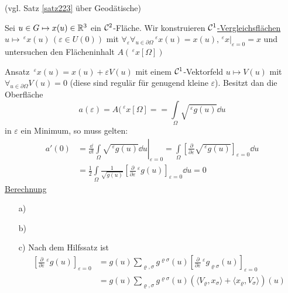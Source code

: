 \begin{beweis}
(vgl. Satz \ref{satz223} über Geodätische) \par
Sei \(u \in G \mapsto x(u) \in \mathbb{R}^3\) ein \(\mathcal{C}^2\)-Fläche. Wir konstruieren \uline{\(\mathcal{C}^1\)-Vergleichsflächen} \(u \mapsto \,^\varepsilon x(u) \, (\varepsilon \in U(0))\) mit \(\forall_\varepsilon \forall_{u \in \partial \Omega} \,^\varepsilon x(u) = x(u), \left.\,^\varepsilon x\right|_{\varepsilon = 0} = x\) und untersuchen den Flächeninhalt \(A(\,^\varepsilon x[\Omega])\) \par
Ansatz \uline{\(\,^\varepsilon x(u) = x(u) + \varepsilon V(u)\)} mit einem \(\mathcal{C}^1\)-Vektorfeld \(u \mapsto V(u)\) mit \uline{\(\forall_{u \in \partial \Omega} V(u) = 0\)} (diese sind regulär für genugend kleine \(\varepsilon\)). Besitzt dan die Oberfläche 
\[
a(\varepsilon) = A(\,^\varepsilon x[\Omega]= = \int\limits_\Omega \sqrt{\,^\varepsilon g(u)} \dd u
\]
in \(\varepsilon\) ein Minimum, so muss gelten:
\begin{align*}
 a'(0) &= \frac{\dd}{\dd t} \left. \int\limits_\Omega \sqrt{\,^\varepsilon g(u)} \dd u \right|_{\varepsilon = 0} = \int\limits_\Omega \left[\frac{\partial}{\partial \varepsilon} \sqrt{\,^\varepsilon g(u)} \right]_{\varepsilon = 0} \dd u \\
 &= \frac12 \int\limits_\Omega \frac{1}{\sqrt{g(u)}} \left[\frac{\partial}{\partial\varepsilon} \,^\varepsilon g(u)\right]_{\varepsilon = 0} \dd u = 0
\end{align*}
\uline{Berechnung}
\begin{enumerate}
 \item[a)] 
 \item[b)] 
 \item[c)] Nach dem Hilfssatz ist
 \begin{align*}
  \left[\frac{\partial}{\partial \varepsilon} \,^\varepsilon g(u) \right]_{\varepsilon = 0} &= g(u) \sum_{\varrho, \sigma} g^{\varrho \sigma} (u) \left[ \frac{\partial}{\partial\varepsilon} \,^\varepsilon g_{\varrho \sigma}(u)\right]_{\varepsilon = 0} \\
  &= g(u) \sum_{\varrho, \sigma} g^{\varrho \sigma} (u) \left(\langle V_\varrho, x_\sigma \rangle + \langle x_\varrho, V_\sigma \rangle \right)(u)
 \end{align*}
\end{enumerate}


\end{beweis}
